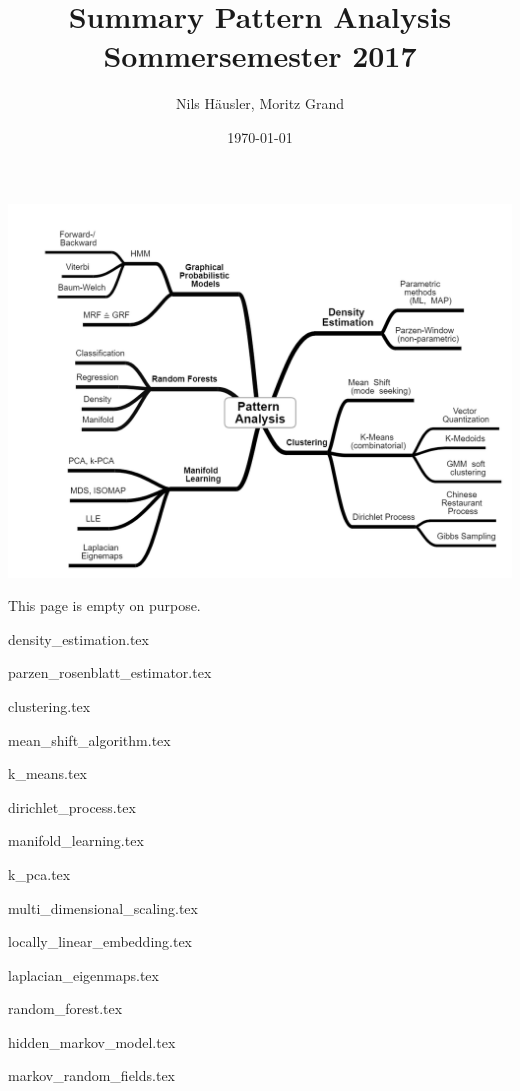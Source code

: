 \documentclass[12p]{article}
\title{Summary Pattern Analysis\\ Sommersemester 2017}
\author{Nils Häusler, Moritz Grand}
\date{\today}
\begin{document}
\begin{titlepage}
  \thispagestyle{empty}
  \maketitle
  \includegraphics[width=\textwidth]{overview.png}
\end{titlepage}

{\centering
	This page is empty on purpose.\par
}

\newpage
{density_estimation.tex}

\newpage
{parzen_rosenblatt_estimator.tex}

\newpage
{clustering.tex}

\newpage
{mean_shift_algorithm.tex}

\newpage
{k_means.tex}

\newpage
{dirichlet_process.tex}

\newpage
{manifold_learning.tex}

\newpage
{k_pca.tex}

\newpage
{multi_dimensional_scaling.tex}

\newpage
{locally_linear_embedding.tex}

\newpage
{laplacian_eigenmaps.tex}

\newpage
{random_forest.tex}

\newpage
{hidden_markov_model.tex}

\newpage
{markov_random_fields.tex}
\end{document}

